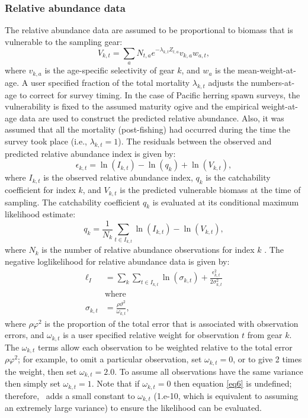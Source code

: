 \subsubsection{Relative abundance data}
The relative abundance data are assumed to be proportional to biomass that is vulnerable to the sampling gear:
\begin{equation}\label{eq4}
 V_{k,t} = \sum_a N_{t,a} e^{-\lambda_{k,t} Z_{t,a}} v_{k,a} w_{a,t},
\end{equation}
where $v_{k,a}$ is the age-specific selectivity of gear $k$, and $w_a$ is the mean-weight-at-age. A user specified fraction of the total mortality $\lambda_{k,t}$ adjusts the numbers-at-age to correct for survey timing.  In the case of Pacific herring spawn surveys, the vulnerability is fixed to the assumed maturity ogive and the empirical weight-at-age data are used to construct the predicted relative abundance.  Also, it was assumed that all the mortality (post-fishing) had occurred during the time the survey took place (i.e., $\lambda_{k,t}=1$).  The residuals between the observed and predicted relative abundance index is given by:
\begin{equation}\label{eq5}
\epsilon_{k,t} = \ln(I_{k,t}) - \ln(q_k)+\ln(V_{k,t}),
\end{equation}
where $I_{k,t}$ is the observed relative abundance index, $q_k$ is the catchability coefficient for index $k$, and $V_{k,t}$ is the predicted vulnerable biomass at the time of sampling.  The catchability coefficient $q_k$ is evaluated at its conditional maximum likelihood estimate:
\[
  q_k =\frac{1}{N_k} \sum_{t \in I_{k,t}} \ln(I_{k,t}) - \ln(V_{k,t}),
\]
where $N_k$ is the number of relative abundance observations for index $k$ \citep[see][for more information]{walters1994calculation}. The negative loglikelihood for relative abundance data is given by:
\begin{align}
\ell_I &= \sum_k \sum_{t \in I_{k,t}}  \ln(\sigma_{k,t})+\frac{\epsilon_{k,t}^2}{2\sigma_{k,t}^2} \label{eq6}\\
&\mbox{where}\nonumber\\
\sigma_{k,t} &= \frac{\rho \vartheta^2}{ \omega_{k,t}},  \nonumber
\end{align}
where $\rho \varphi^2$ is the proportion of the total error that is associated with observation errors, and $\omega_{k,t}$ is a user specified relative weight for observation $t$ from gear $k$.  The $ \omega_{k,t}$ terms allow each observation to be weighted relative to the total error $\rho \varphi^2$; for example, to omit a particular observation, set $\omega_{k,t}=0$, or to give 2 times the weight, then set  $\omega_{k,t}=2.0$. To assume all observations have the same variance then simply set  $\omega_{k,t}=1$.  Note that if  $\omega_{k,t}=0$ then equation \eqref{eq6} is undefined; therefore, \iscam\ adds a small constant to  $\omega_{k,t}$ (1.e-10, which is equivalent to assuming an extremely large variance)  to ensure the likelihood can be evaluated.


